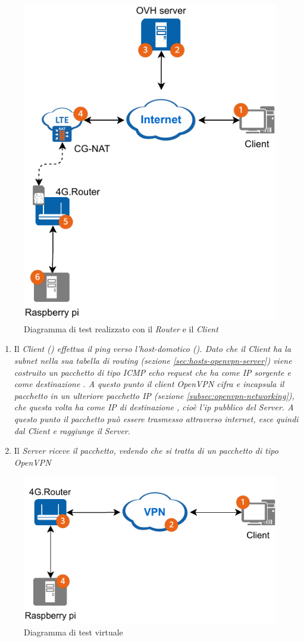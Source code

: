 \begin{figure}[H]
    \centering
    \includegraphics[width=0.5\linewidth]{immagini/diag2-test_real}
    \caption{Diagramma di test realizzato con il \textit{Router} e il \textit{Client}}
    \label{fig:diag-test-real}
\end{figure}

\begin{enumerate}
    \item Il \it{Client} () effettua il ping verso l'\it{host-domotico} (). Dato che il \it{Client} ha la subnet  nella sua tabella di routing (sezione \ref{sec:hosts-openvpn-server}) viene costruito un pacchetto di tipo ICMP \it{echo request} che ha come IP sorgente  e come destinazione . A questo punto il client OpenVPN cifra e incapsula il pacchetto in un ulteriore pacchetto IP (sezione \ref{subsec:openvpn-networking}), che questa volta ha come IP di destinazione , cioè l'ip pubblico del \it{Server}. A questo punto il pacchetto può essere trasmesso attraverso internet, esce quindi dal \it{Client} e raggiunge il \it{Server}.
    \item Il \it{Server} riceve il pacchetto, vedendo che si tratta di un pacchetto di tipo OpenVPN 
\end{enumerate}


\begin{figure}[H]
    \centering
    \includegraphics[width=0.5\linewidth]{immagini/diag2-test_virtual}
    \caption{Diagramma di test virtuale}
    \label{fig:diag-test_virtual}
\end{figure}



